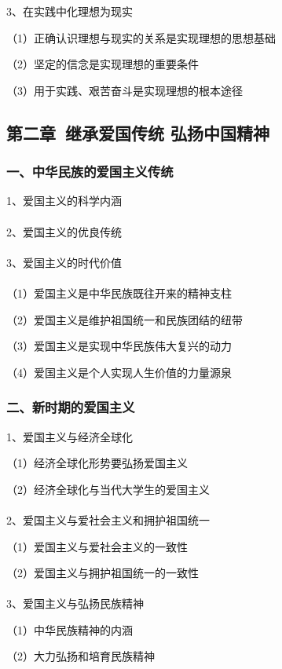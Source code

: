 \documentclass{ctexart}
\begin{document}
3、在实践中化理想为现实

（1）正确认识理想与现实的关系是实现理想的思想基础

（2）坚定的信念是实现理想的重要条件

（3）用于实践、艰苦奋斗是实现理想的根本途径

\subsection{第二章\ 继承爱国传统 弘扬中国精神}

\subsubsection{一、中华民族的爱国主义传统}

1、爱国主义的科学内涵
\\\\

2、爱国主义的优良传统
\\\\

3、爱国主义的时代价值
\\\\	

（1）爱国主义是中华民族既往开来的精神支柱

（2）爱国主义是维护祖国统一和民族团结的纽带

（3）爱国主义是实现中华民族伟大复兴的动力

（4）爱国主义是个人实现人生价值的力量源泉

\subsubsection{二、新时期的爱国主义}
1、爱国主义与经济全球化

（1）经济全球化形势要弘扬爱国主义

（2）经济全球化与当代大学生的爱国主义
\\\\

2、爱国主义与爱社会主义和拥护祖国统一

（1）爱国主义与爱社会主义的一致性

（2）爱国主义与拥护祖国统一的一致性
\\\\

3、爱国主义与弘扬民族精神

（1）中华民族精神的内涵

（2）大力弘扬和培育民族精神
\\\\
\end{document}
